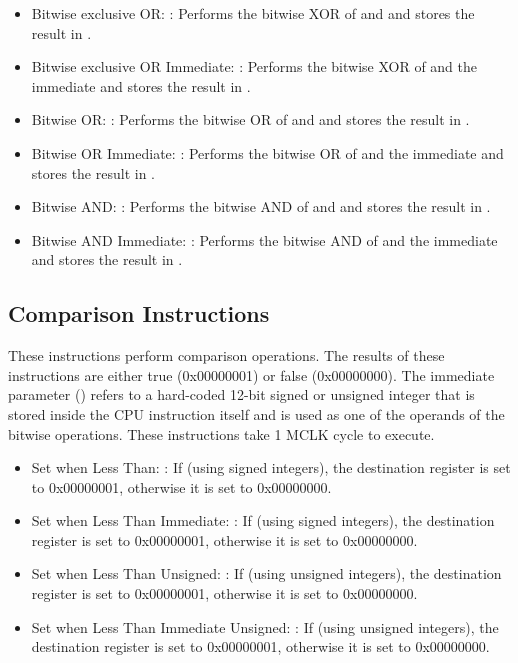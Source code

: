 \documentclass[11pt,pdftex,portrait,letterpaper]{article}
\begin{document}
\begin{itemize}
	\item Bitwise exclusive OR: : Performs the bitwise XOR of  and  and stores the result in . 
	\item Bitwise exclusive OR Immediate: : Performs the bitwise XOR of  and the immediate  and stores the result in .
	\item Bitwise OR: : Performs the bitwise OR of  and  and stores the result in . 
	\item Bitwise OR Immediate: : Performs the bitwise OR of  and the immediate  and stores the result in .
	\item Bitwise AND: : Performs the bitwise AND of  and  and stores the result in . 
	\item Bitwise AND Immediate: : Performs the bitwise AND of  and the immediate  and stores the result in .
\end{itemize}

\subsection{Comparison Instructions}

These instructions perform comparison operations. The results of these instructions are either true (0x00000001) or false (0x00000000). The immediate parameter () refers to a hard-coded 12-bit signed or unsigned integer that is stored inside the CPU instruction itself and is used as one of the operands of the bitwise operations. These instructions take 1 MCLK cycle to execute.

\begin{itemize}
	\item Set when Less Than: : If  (using signed integers), the destination register  is set to 0x00000001, otherwise it is set to 0x00000000.
	\item Set when Less Than Immediate: : If  (using signed integers), the destination register  is set to 0x00000001, otherwise it is set to 0x00000000.
	\item Set when Less Than Unsigned: : If  (using unsigned integers), the destination register  is set to 0x00000001, otherwise it is set to 0x00000000.
	\item Set when Less Than Immediate Unsigned: : If  (using unsigned integers), the destination register  is set to 0x00000001, otherwise it is set to 0x00000000.
\end{itemize}
\end{document}
